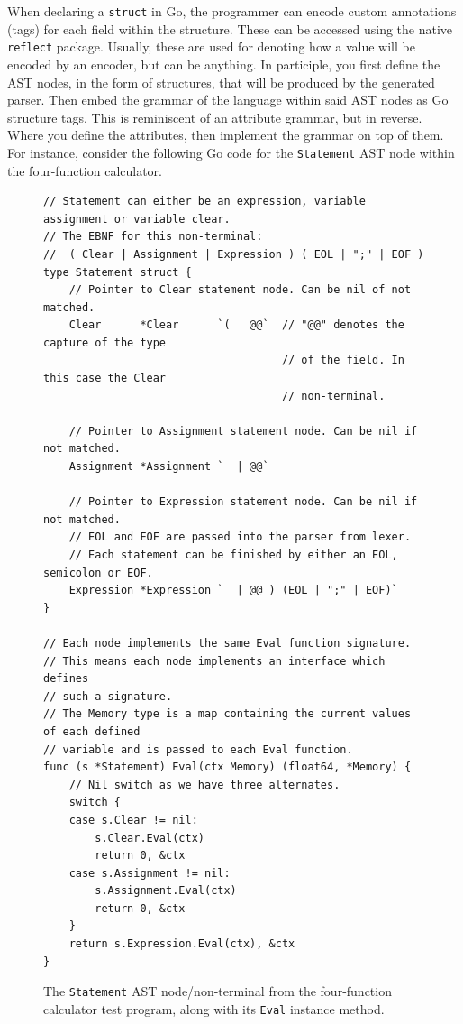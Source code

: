 \documentclass[]{full}
\theoremstyle{definition}
\begin{document}
When declaring a \verb|struct| in Go, the programmer can encode custom annotations (tags) for each field within the structure. These can be accessed using the native \verb|reflect| package. Usually, these are used for denoting how a value will be encoded by an encoder, but can be anything. In participle, you first define the AST nodes, in the form of structures, that will be produced by the generated parser. Then embed the grammar of the language within said AST nodes as Go structure tags. This is reminiscent of an attribute grammar, but in reverse. Where you define the attributes, then implement the grammar on top of them. For instance, consider the following Go code for the \verb|Statement| AST node within the four-function calculator.

\begin{figure}[H]
    \begin{verbatim}
// Statement can either be an expression, variable assignment or variable clear.
// The EBNF for this non-terminal:
//  ( Clear | Assignment | Expression ) ( EOL | ";" | EOF )
type Statement struct {
    // Pointer to Clear statement node. Can be nil of not matched.
    Clear      *Clear      `(   @@`  // "@@" denotes the capture of the type 
                                     // of the field. In this case the Clear
                                     // non-terminal.

    // Pointer to Assignment statement node. Can be nil if not matched.
    Assignment *Assignment `  | @@`

    // Pointer to Expression statement node. Can be nil if not matched.
    // EOL and EOF are passed into the parser from lexer.
    // Each statement can be finished by either an EOL, semicolon or EOF.
    Expression *Expression `  | @@ ) (EOL | ";" | EOF)`
}

// Each node implements the same Eval function signature.
// This means each node implements an interface which defines
// such a signature.
// The Memory type is a map containing the current values of each defined
// variable and is passed to each Eval function.
func (s *Statement) Eval(ctx Memory) (float64, *Memory) {
    // Nil switch as we have three alternates.
    switch {
    case s.Clear != nil:
        s.Clear.Eval(ctx)
        return 0, &ctx
    case s.Assignment != nil:
        s.Assignment.Eval(ctx)
        return 0, &ctx
    }
    return s.Expression.Eval(ctx), &ctx
}
    \end{verbatim}
    \label{fig:four-func-calc-statement-ast-node}
    \cprotect\caption{The \verb|Statement| AST node/non-terminal from the four-function calculator test program, along with its \verb|Eval| instance method.}
\end{figure}
\end{document}
